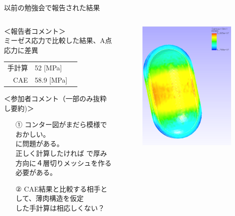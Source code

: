 \begin{frame}{以前の勉強会で報告された結果}
 
    \begin{columns}[t]
    \begin{column}{0.7\textwidth}
       ＜報告者コメント＞ \\
         ミーゼス応力で比較した結果、A点応力に差異 \\
          \begin{table}[hbtp]
            \begin{tabular}{rlp{10em}} %
               手計算 & 52 [\si{\mega\pascal}] & \\
               CAE    & 58.9 [\si{\mega\pascal}]  & \\
            \end{tabular}
          \end{table}
        ＜参加者コメント（一部のみ抜粋し要約)＞ \\
         \begin{itemize}
            \item[①] コンター図がまだら模様でおかしい。\\
                     に問題がある。 \\
                     正しく計算したければ で厚み\\
                     方向に４層切りメッシュを作る必要がある。\\
            \item[②] CAE結果と比較する相手として、薄肉構造を仮定 \\
                     した手計算は相応しくない？
         \end{itemize}
    \end{column}
    \begin{column}{0.3\textwidth}
      \begin{figure}[htbp]
        \begin{center}
          \includegraphics[keepaspectratio,scale=1.5]{images/previous.png}

\end{center}
\end{figure}
\end{column}
\end{columns}
\end{frame}
